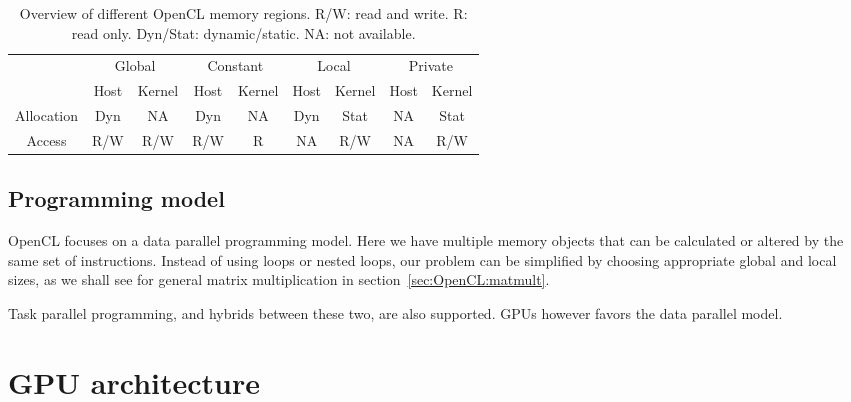 \begin{table}
\begin{center}
\begin{tabular}{c|cc|cc|cc|cc}
& \multicolumn{2}{c|}{Global} & \multicolumn{2}{c|}{Constant} & \multicolumn{2}{c|}{Local} & \multicolumn{2}{c}{Private}\\
& Host & Kernel& Host & Kernel& Host & Kernel& Host & Kernel \\
\hline
Allocation & Dyn & NA & Dyn & NA & Dyn & Stat & NA & Stat\\ 
Access & R/W & R/W & R/W & R & NA & R/W & NA & R/W\\ 
\hline 
\end{tabular} 
\caption{Overview of different OpenCL memory regions. R/W: read and write. R: read only. Dyn/Stat: dynamic/static. NA: not available.}
\label{tab:OpenCL:memory}
\end{center}
\end{table}



\subsection{Programming model}
OpenCL focuses on a data parallel programming model.
Here we have multiple memory objects that can be calculated or altered by the same set of instructions. 
Instead of using loops or nested loops, our problem can be simplified by choosing appropriate global and local sizes, as we shall see for general matrix multiplication in section~\ref{sec:OpenCL:matmult}.

Task parallel programming, and hybrids between these two, are also supported. 
GPUs however favors the data parallel model.




\section{GPU architecture}
\label{sec:OpenCL:GPUarchitecture}




